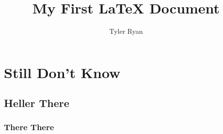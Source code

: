 \documentclass{book}
\author{Tyler Ryan}
\title{My First {\LaTeX} Document}
\begin{document}
\frontmatter
\tableofcontents

\mainmatter
\chapter{Still Don't Know\label{sdk}}
\section{Heller There}
\subsection{There There}
\end{document}
